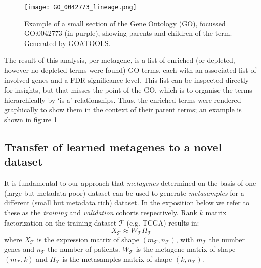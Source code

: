 \documentclass[tikz, 12pt,a4paper,oneside,fleqn]{article}
\begin{document}
\begin{figure}[htb!]
\begin{center}
\texttt{[image: GO\_0042773\_lineage.png]}
\caption{Example of a small section of the Gene Ontology (GO), focussed GO:0042773 (in purple), showing parents and children of the term.   Generated by GOATOOLS.}
\label{fig-eg_go_graphic}
\end{center}
\end{figure}

The result of this analysis, per metagene, is a list of enriched (or depleted, however no depleted terms were found) GO terms, each with an associated list of involved genes and a FDR significance level.   This list can be inspected directly for insights, but that misses the point of the GO, which is to organise the terms hierarchically by `is a' relationships.   Thus, the enriched terms were rendered graphically to show them in the context of their parent terms; an example is shown in figure \ref{fig-eg_go_graphic}


\subsection{Transfer of learned metagenes to a novel dataset}
\label{sec-transfer-to-novel}

\newcommand{\trainset}{\mathcal{T}}
\newcommand{\validset}{\mathcal{V}}

It is fundamental to our approach that \emph{metagenes} determined on the basis of one (large but metadata poor) dataset can be used to generate \emph{metasamples} for a different (small but metadata rich) dataset.   In the exposition below we refer to these as the \emph{training} and \emph{validation} cohorts respectively.
Rank $k$ matrix factorization on the training dataset $\trainset$ (e.g. TCGA) results in:
\begin{equation}
 X_\trainset \approx W_\trainset H_\trainset
\end{equation}
where $X_\trainset$ is the expression matrix of shape $(m_\trainset, n_\trainset)$, with $m_\trainset$ the number genes and $n_\trainset$ the number of patients. $W_\trainset$ is the metagene matrix of shape $(m_\trainset, k)$ and $H_\trainset$ is the metasamples matrix of shape $(k, n_\trainset)$.
\end{document}
